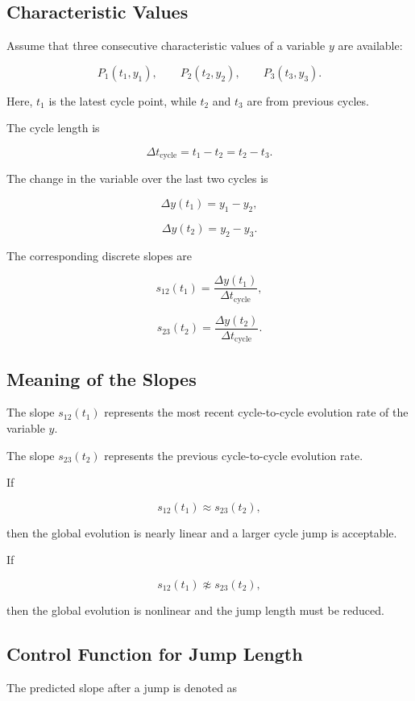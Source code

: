 ﻿\documentclass[11pt,a4paper]{article}
\begin{document}
\subsection{Characteristic Values}

Assume that three consecutive characteristic values of a variable $y$ are available:

\[
P_1(t_1,y_1), \qquad P_2(t_2,y_2), \qquad P_3(t_3,y_3).
\]

Here, $t_1$ is the latest cycle point, while $t_2$ and $t_3$ are from previous cycles.

The cycle length is

\[
\Delta t_{\mathrm{cycle}} = t_1 - t_2 = t_2 - t_3.
\]

The change in the variable over the last two cycles is

\[
\Delta y(t_1) = y_1 - y_2,
\]

\[
\Delta y(t_2) = y_2 - y_3.
\]

The corresponding discrete slopes are

\[
s_{12}(t_1) =
\frac{\Delta y(t_1)}{\Delta t_{\mathrm{cycle}}},
\]

\[
s_{23}(t_2) =
\frac{\Delta y(t_2)}{\Delta t_{\mathrm{cycle}}}.
\]

\subsection{Meaning of the Slopes}

The slope $s_{12}(t_1)$ represents the most recent cycle-to-cycle evolution rate of the variable $y$.

The slope $s_{23}(t_2)$ represents the previous cycle-to-cycle evolution rate.

If

\[
s_{12}(t_1) \approx s_{23}(t_2),
\]

then the global evolution is nearly linear and a larger cycle jump is acceptable.

If

\[
s_{12}(t_1) \not\approx s_{23}(t_2),
\]

then the global evolution is nonlinear and the jump length must be reduced.

\subsection{Control Function for Jump Length}

The predicted slope after a jump is denoted as
\end{document}
